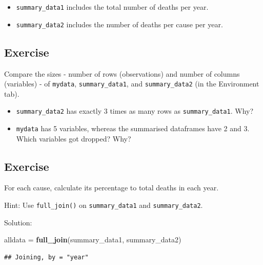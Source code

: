 \documentclass[]{book}
\makeatletter
\newenvironment{Shaded}{\begin{snugshade}}{\end{snugshade}}
\newcommand{\KeywordTok}[1]{\textcolor[rgb]{0.13,0.29,0.53}{\textbf{#1}}}
\newcommand{\DecValTok}[1]{\textcolor[rgb]{0.00,0.00,0.81}{#1}}
\newcommand{\StringTok}[1]{\textcolor[rgb]{0.31,0.60,0.02}{#1}}
\newcommand{\OperatorTok}[1]{\textcolor[rgb]{0.81,0.36,0.00}{\textbf{#1}}}
\newcommand{\NormalTok}[1]{#1}
\providecommand{\tightlist}{%
  \setlength{\itemsep}{0pt}\setlength{\parskip}{0pt}}
\newenvironment{kframe}{%
\medskip{}
\setlength{\fboxsep}{.8em}
 \def\at@end@of@kframe{}%
 \ifinner\ifhmode%
  \def\at@end@of@kframe{\end{minipage}}%
  \begin{minipage}{\columnwidth}%
 \fi\fi%
 \def\FrameCommand##1{\hskip\@totalleftmargin \hskip-\fboxsep
 \colorbox{shadecolor}{##1}\hskip-\fboxsep
     \hskip-\linewidth \hskip-\@totalleftmargin \hskip\columnwidth}%
 \MakeFramed {\advance\hsize-\width
   \@totalleftmargin\z@ \linewidth\hsize
   \@setminipage}}%
 {\par\unskip\endMakeFramed%
 \at@end@of@kframe}
\renewenvironment{Shaded}{\begin{kframe}}{\end{kframe}}
\makeatother
\begin{document}
\begin{itemize}
\tightlist
\item
  \texttt{summary\_data1} includes the total number of deaths per year.
\item
  \texttt{summary\_data2} includes the number of deaths per cause per
  year.
\end{itemize}

\subsection{Exercise}\label{exercise-16}

Compare the sizes - number of rows (observations) and number of columns
(variables) - of \texttt{mydata}, \texttt{summary\_data1}, and
\texttt{summary\_data2} (in the Environment tab).

\begin{itemize}
\tightlist
\item
  \texttt{summary\_data2} has exactly 3 times as many rows as
  \texttt{summary\_data1}. Why?
\item
  \texttt{mydata} has 5 variables, whereas the summarised dataframes
  have 2 and 3. Which variables got dropped? Why?
\end{itemize}

\subsection{Exercise}\label{exercise-17}

For each cause, calculate its percentage to total deaths in each year.

Hint: Use \texttt{full\_join()} on \texttt{summary\_data1} and
\texttt{summary\_data2}.

Solution:

\begin{Shaded}
\begin{Highlighting}[]
\NormalTok{alldata =}\StringTok{ }\KeywordTok{full_join}\NormalTok{(summary_data1, summary_data2)}
\end{Highlighting}
\end{Shaded}

\begin{verbatim}
## Joining, by = "year"
\end{verbatim}

\begin{Shaded}
\end{Shaded}
\end{document}

